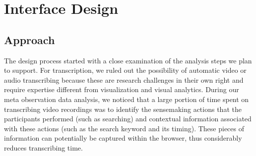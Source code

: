 \section{Interface Design}
\label{sec:sp-design}

\subsection{Approach}
The design process started with a close examination of the analysis steps we plan to support. For transcription, we ruled out the possibility of automatic video or audio transcribing because these are research challenges in their own right and require expertise different from visualization and visual analytics. During our meta observation data analysis, we noticed that a large portion of time spent on transcribing video recordings was to identify the sensemaking actions that the participants performed (such as searching) and contextual information associated with these actions (such as the search keyword and its timing). These pieces of information can potentially be captured within the browser, thus considerably reduces transcribing time.

